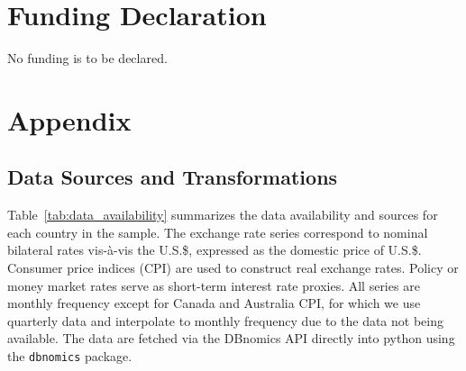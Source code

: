 \documentclass[a4paper,10pt,final]{article}    %
\begin{document}
\section*{Funding Declaration}

No funding is to be declared.



\clearpage

{}



\clearpage

\appendix
\section{Appendix}


\subsection{Data Sources and Transformations}
\label{app:data_details}

Table~\ref{tab:data_availability} summarizes the data availability and sources for each country in the sample. The exchange rate series correspond to nominal bilateral rates vis-\`a-vis the U.S.\$, expressed as the domestic price of U.S.\$. Consumer price indices (CPI) are used to construct real exchange rates. Policy or money market rates serve as short-term interest rate proxies. All series are monthly frequency except for Canada and Australia CPI, for which we use quarterly data and interpolate to monthly frequency due to the data not being available. The data are fetched via the DBnomics API directly into python using the \texttt{dbnomics} package.
\end{document}
